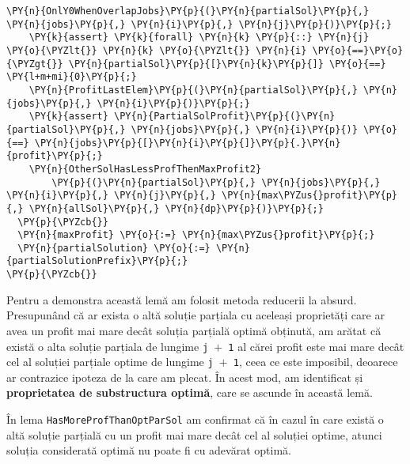 \begin{footnotesize}
\begin{Verbatim}[commandchars=\\\{\}, fontsize=\footnotesize]
    \PY{n}{OnlY0WhenOverlapJobs}\PY{p}{(}\PY{n}{partialSol}\PY{p}{,} \PY{n}{jobs}\PY{p}{,} \PY{n}{i}\PY{p}{,} \PY{n}{j}\PY{p}{)}\PY{p}{;} 
    \PY{k}{assert} \PY{k}{forall} \PY{n}{k} \PY{p}{::} \PY{n}{j} \PY{o}{\PYZlt{}} \PY{n}{k} \PY{o}{\PYZlt{}} \PY{n}{i} \PY{o}{==}\PY{o}{\PYZgt{}} \PY{n}{partialSol}\PY{p}{[}\PY{n}{k}\PY{p}{]} \PY{o}{==} \PY{l+m+mi}{0}\PY{p}{;}
    \PY{n}{ProfitLastElem}\PY{p}{(}\PY{n}{partialSol}\PY{p}{,} \PY{n}{jobs}\PY{p}{,} \PY{n}{i}\PY{p}{)}\PY{p}{;}
    \PY{k}{assert} \PY{n}{PartialSolProfit}\PY{p}{(}\PY{n}{partialSol}\PY{p}{,} \PY{n}{jobs}\PY{p}{,} \PY{n}{i}\PY{p}{)} \PY{o}{==} \PY{n}{jobs}\PY{p}{[}\PY{n}{i}\PY{p}{]}\PY{p}{.}\PY{n}{profit}\PY{p}{;}
    \PY{n}{OtherSolHasLessProfThenMaxProfit2}
        \PY{p}{(}\PY{n}{partialSol}\PY{p}{,} \PY{n}{jobs}\PY{p}{,} \PY{n}{i}\PY{p}{,} \PY{n}{j}\PY{p}{,} \PY{n}{max\PYZus{}profit}\PY{p}{,} \PY{n}{allSol}\PY{p}{,} \PY{n}{dp}\PY{p}{)}\PY{p}{;}
  \PY{p}{\PYZcb{}}
  \PY{n}{maxProfit} \PY{o}{:=} \PY{n}{max\PYZus{}profit}\PY{p}{;}
  \PY{n}{partialSolution} \PY{o}{:=} \PY{n}{partialSolutionPrefix}\PY{p}{;}
\PY{p}{\PYZcb{}}
\end{Verbatim}
\end{footnotesize}

Pentru a demonstra această lemă am folosit metoda reducerii la absurd. Presupunând că ar exista o altă soluție parțiala cu aceleași proprietăți care ar avea un profit mai mare decât soluția parțială optimă obținută, am arătat că există o alta soluție parțiala de lungime \texttt{j $+$ 1} al cărei profit este mai mare decât cel al soluției parțiale optime de lungime \texttt{j $+$ 1}, ceea ce este imposibil, deoarece ar contrazice ipoteza de la care am plecat. În acest mod, am identificat și \textbf{proprietatea de substructura optimă}, care se ascunde în această lemă. 

În lema \texttt{HasMoreProfThanOptParSol} am confirmat că în cazul în care există o altă soluție parțială cu un profit mai mare decât cel al soluției optime, atunci soluția considerată optimă nu poate fi cu adevărat optimă.


